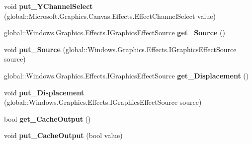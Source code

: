 \begin{DoxyCompactItemize}
void {\bfseries put\+\_\+\+Y\+Channel\+Select} (global\+::\+Microsoft.\+Graphics.\+Canvas.\+Effects.\+Effect\+Channel\+Select value)
\item 
\mbox{\label{class_microsoft_1_1_graphics_1_1_canvas_1_1_effects_1_1_displacement_map_effect_af69fbee08f58e40ff331229945a58a92}} 
global\+::\+Windows.\+Graphics.\+Effects.\+I\+Graphics\+Effect\+Source {\bfseries get\+\_\+\+Source} ()
\item 
\mbox{\label{class_microsoft_1_1_graphics_1_1_canvas_1_1_effects_1_1_displacement_map_effect_a111bf667fceee07085a750745d777c13}} 
void {\bfseries put\+\_\+\+Source} (global\+::\+Windows.\+Graphics.\+Effects.\+I\+Graphics\+Effect\+Source source)
\item 
\mbox{\label{class_microsoft_1_1_graphics_1_1_canvas_1_1_effects_1_1_displacement_map_effect_aaf5364680c98ed0f56450c34b38dd81a}} 
global\+::\+Windows.\+Graphics.\+Effects.\+I\+Graphics\+Effect\+Source {\bfseries get\+\_\+\+Displacement} ()
\item 
\mbox{\label{class_microsoft_1_1_graphics_1_1_canvas_1_1_effects_1_1_displacement_map_effect_ae673a7b19adf4c74fc290965e8c469d3}} 
void {\bfseries put\+\_\+\+Displacement} (global\+::\+Windows.\+Graphics.\+Effects.\+I\+Graphics\+Effect\+Source source)
\item 
\mbox{\label{class_microsoft_1_1_graphics_1_1_canvas_1_1_effects_1_1_displacement_map_effect_a98dc9dff78bcf54a0714684a37fac496}} 
bool {\bfseries get\+\_\+\+Cache\+Output} ()
\item 
\mbox{\label{class_microsoft_1_1_graphics_1_1_canvas_1_1_effects_1_1_displacement_map_effect_a6ea6152dfdb5861dd9ddb378972ab881}} 
void {\bfseries put\+\_\+\+Cache\+Output} (bool value)
\item 
\mbox{\label{class_microsoft_1_1_graphics_1_1_canvas_1_1_effects_1_1_displacement_map_effect_a85345dfa5889a8d0eeaa2c0eef0af1f6}} 

\end{DoxyCompactItemize}
